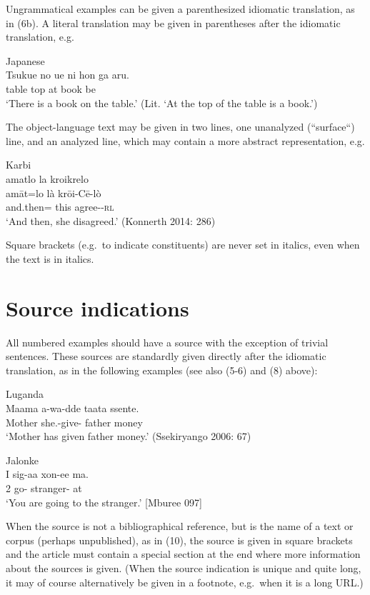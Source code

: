 \documentclass[a4paper]{article}
\newcommand{\eagsr}{\bgroup\color{blue}\ea}
\newcommand{\zgsr}{\z\egroup}
\newcommand{\RL}{\textsc{rl}}
\begin{document}
Ungrammatical examples can be given a parenthesized idiomatic
translation, as in (6b). A literal translation may be given in
parentheses after the idiomatic translation, e.g.

\eagsr
\upshape Japanese\\
\gll Tsukue no     ue  ni hon  ga      aru.\\ 
     table  \GEN{} top at book \SBJ{} be\\
\glt `There is a book on the table.' (Lit. `At the top of the table is a book.')
\zgsr

The object-language text may be given in two lines, one unanalyzed
(``surface``) line, and an analyzed line, which may contain a more
abstract representation, e.g.

\eagsr
\upshape Karbi\\
\glll amatlo          la   kroikrelo\\
      amāt=lo 	      là   krōi-Cē-lò\\
      and.then=\FOC{} this agree-\NEG-\RL\\
\glt `And then, she disagreed.' (Konnerth 2014: 286)
\zgsr

Square brackets (e.g.~to indicate constituents) are never set in
italics, even when the text is in italics.

\section{Source indications}\label{sec:source-indications}

All numbered examples should have a source with the exception of trivial
sentences. These sources are standardly given directly after the
idiomatic translation, as in the following examples (see also (5-6) and
(8) above):

\eagsr
\upshape Luganda\\ 
\gll Maama  a-wa-dde             taata  ssente.\\
     Mother she.\PRS-give-\PRF{} father money\\
\glt `Mother has given father money.' (Ssekiryango 2006: 67)
\zgsr

\eagsr
\upshape Jalonke\\
\gll  I    sig-aa     xon-ee          ma.\\
      2\SG{} go-\IPFV{} stranger-\DEF{} at\\
\glt `You are going to the stranger.' [Mburee 097]
\zgsr

When the source is not a bibliographical reference, but is the name of a
text or corpus (perhaps unpublished), as in (10), the source is given in
square brackets and the article must contain a special section at the
end where more information about the sources is given. (When the source
indication is unique and quite long, it may of course alternatively be
given in a footnote, e.g.~when it is a long URL.)
\end{document}
